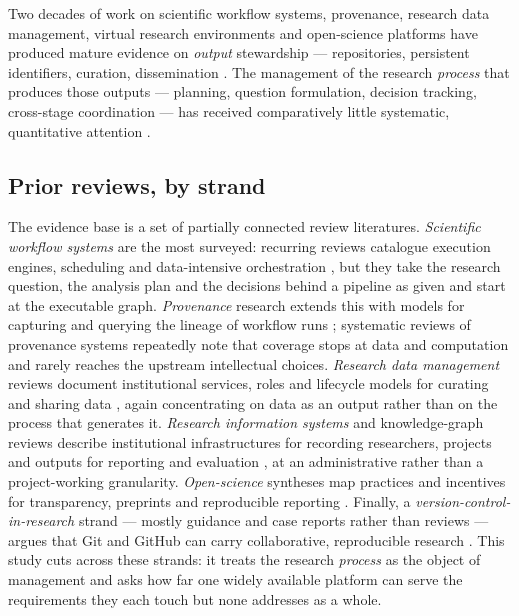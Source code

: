 \documentclass[pdflatex,sn-mathphys-num]{sn-jnl}%
\begin{document}
Two decades of work on scientific workflow systems, provenance, research data management, virtual research environments and open-science platforms have produced mature evidence on \emph{output} stewardship --- repositories, persistent identifiers, curation, dissemination \citep{davidson2008,perez2018,ho2025,kirkham2020,mayernik2017}. The management of the research \emph{process} that produces those outputs --- planning, question formulation, decision tracking, cross-stage coordination --- has received comparatively little systematic, quantitative attention \citep{cox2018,holler2022,devkota2026}.

\subsection{Prior reviews, by strand}\label{sec:related}

The evidence base is a set of partially connected review literatures. \emph{Scientific workflow systems} are the most surveyed: recurring reviews catalogue execution engines, scheduling and data-intensive orchestration \citep{liew2016,liu2015,mattoso2015}, but they take the research question, the analysis plan and the decisions behind a pipeline as given and start at the executable graph. \emph{Provenance} research extends this with models for capturing and querying the lineage of workflow runs \citep{davidson2008,oliveira2018,perez2018}; systematic reviews of provenance systems repeatedly note that coverage stops at data and computation and rarely reaches the upstream intellectual choices. \emph{Research data management} reviews document institutional services, roles and lifecycle models for curating and sharing data \citep{perrier2017,donner2022,cox2018,ho2025}, again concentrating on data as an output rather than on the process that generates it. \emph{Research information systems} and knowledge-graph reviews describe institutional infrastructures for recording researchers, projects and outputs for reporting and evaluation \citep{mayernik2017,haris2026}, at an administrative rather than a project-working granularity. \emph{Open-science} syntheses map practices and incentives for transparency, preprints and reproducible reporting \citep{klebel2025,kirkham2020}. Finally, a \emph{version-control-in-research} strand --- mostly guidance and case reports rather than reviews --- argues that Git and GitHub can carry collaborative, reproducible research \citep{sandve2013,blischak2016,wilson2017,braga2023}. This study cuts across these strands: it treats the research \emph{process} as the object of management and asks how far one widely available platform can serve the requirements they each touch but none addresses as a whole.
\end{document}
